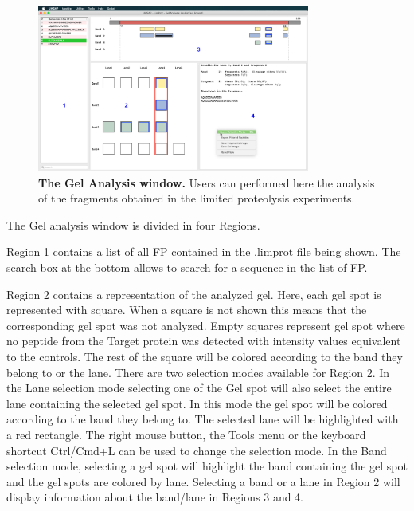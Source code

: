 \begin{figure}[h]
	\centering
	\includegraphics[width=0.8\textwidth]{./IMAGES/MOD-LIMPROT/limprot-frag.jpg}	    
	\caption[The Gel Analysis window]{\textbf{The Gel Analysis window.} Users can performed here the analysis of the fragments obtained in the limited proteolysis experiments.} 
	\label{fig:limprotResultsWindow}
	\vspace{-5pt} 	
\end{figure}

The Gel analysis window is divided in four Regions.

Region \num{1} contains a list of all FP contained in the .limprot file being shown. The search box at the bottom allows to search for a sequence in the list of FP. 

Region \num{2} contains a representation of the analyzed gel. Here, each gel spot is represented with square. When a square is not shown this means that the corresponding gel spot was not analyzed. Empty squares represent gel spot where no peptide from the Target protein was detected with intensity values equivalent to the controls. The rest of the square will be colored according to the band they belong to or the lane. There are two selection modes available for Region \num{2}. In the Lane selection mode selecting one of the Gel spot will also select the entire lane containing the selected gel spot. In this mode the gel spot will be colored according to the band they belong to. The selected lane will be highlighted with a red rectangle. The right mouse button, the Tools menu or the keyboard shortcut Ctrl/Cmd+L can be used to change the selection mode. In the Band selection mode, selecting a gel spot will highlight the band containing the gel spot and the gel spots are colored by lane. Selecting a band or a lane in Region \num{2} will display information about the band/lane in Regions \num{3} and \num{4}.

